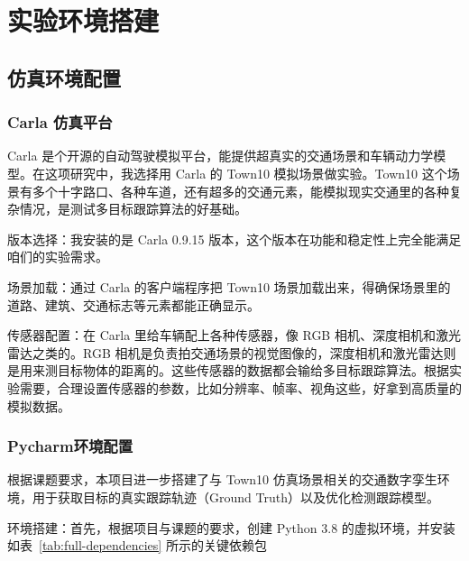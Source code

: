 \chapter{实验环境搭建}

\section{仿真环境配置}

\subsection{Carla 仿真平台}


Carla 是个开源的自动驾驶模拟平台，能提供超真实的交通场景和车辆动力学模型。在这项研究中，我选择用 Carla 的 Town10 模拟场景做实验。Town10 这个场景有多个十字路口、各种车道，还有超多的交通元素，能模拟现实交通里的各种复杂情况，是测试多目标跟踪算法的好基础。

版本选择：我安装的是 Carla 0.9.15 版本，这个版本在功能和稳定性上完全能满足咱们的实验需求。

场景加载：通过 Carla 的客户端程序把 Town10 场景加载出来，得确保场景里的道路、建筑、交通标志等元素都能正确显示。

传感器配置：在 Carla 里给车辆配上各种传感器，像 RGB 相机、深度相机和激光雷达之类的。RGB 相机是负责拍交通场景的视觉图像的，深度相机和激光雷达则是用来测目标物体的距离的。这些传感器的数据都会输给多目标跟踪算法。根据实验需要，合理设置传感器的参数，比如分辨率、帧率、视角这些，好拿到高质量的模拟数据。



\subsection{Pycharm环境配置}
根据课题要求，本项目进一步搭建了与 Town10 仿真场景相关的交通数字孪生环境，用于获取目标的真实跟踪轨迹（Ground Truth）以及优化检测跟踪模型。

环境搭建：首先，根据项目与课题的要求，创建 Python 3.8 的虚拟环境，并安装如表~\ref{tab:full-dependencies} 所示的关键依赖包

